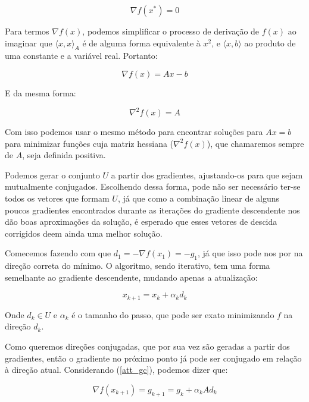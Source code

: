 \begin{equation}
\nabla f(x^*) = 0
\end{equation}

Para termos \(\nabla f(x)\), podemos simplificar o processo de derivação de \(f(x)\) ao imaginar
que \(\langle x, x \rangle_A\) é de alguma forma equivalente à \(x^2\), e \(\langle x, b \rangle\)
ao produto de uma constante e a variável real. Portanto:

\begin{equation}
\nabla f(x) = Ax - b
\end{equation}

E da mesma forma:

\begin{equation}
\nabla^2 f(x) = A
\end{equation}

Com isso podemos usar o mesmo método para encontrar soluções para \(Ax = b\) para
minimizar funções cuja matriz hessiana (\(\nabla^2 f(x)\)), que chamaremos sempre de \(A\),
seja definida positiva.

Podemos gerar o conjunto \(U\) a partir dos gradientes, ajustando-os para que sejam
mutualmente conjugados. Escolhendo dessa forma, pode não ser necessário ter-se todos os
vetores que formam \(U\), já que como a combinação linear de alguns poucos gradientes
encontrados durante as iterações do gradiente descendente nos dão boas aproximações da
solução, é esperado que esses vetores de descida corrigidos deem ainda uma melhor
solução.

Comecemos fazendo com que \(d_1 = -\nabla f(x_1) = -g_1 \), já que isso pode nos por na
direção correta do mínimo. O algoritmo, sendo iterativo, tem uma forma semelhante ao
gradiente descendente, mudando apenas a atualização:

\begin{equation}
\label{att_gc}
x_{k+1} = x_k + \alpha_k d_k
\end{equation}

Onde \(d_k \in U\) e \(\alpha_k\) é o tamanho do passo, que pode ser exato minimizando
\(f\) na direção \(d_k\).

Como queremos direções conjugadas, que por sua vez são geradas a partir dos gradientes,
então o gradiente no próximo ponto já pode ser conjugado em relação à direção atual.
Considerando (\ref{att_gc}), podemos dizer que:

\begin{equation}
  \label{def_gc_gk1}
  \nabla f(x_{k+1}) = g_{k+1} = g_k + \alpha_k Ad_k
\end{equation}

